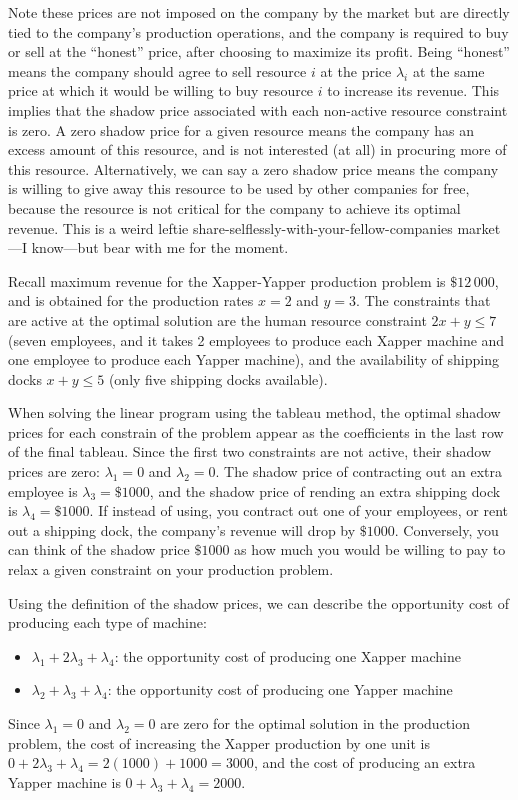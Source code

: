 \documentclass[11pt,oneside]{article}
\begin{document}
			\noindent
			Note these prices are not imposed on the company by the market but are directly tied to the company's production operations, 
			and the company is required to buy or sell at the ``honest'' price, 
			after choosing to maximize its profit.
			Being ``honest'' means the company should agree to sell resource $i$ at the price $\lambda_i$ at the same price
			at which it would be willing to buy resource $i$ to increase its revenue.
			This implies that the shadow price associated with each non-active resource constraint is zero.
			A zero shadow price for a given resource means the company has an excess amount of this resource,
			and is not interested (at all) in procuring more of this resource.
			Alternatively, 
			we can say a zero shadow price means the company is willing to give away this resource
			to be used by other companies for free, 
			because the resource is not critical for the company to achieve its optimal revenue. 
			This is a weird leftie share-selflessly-with-your-fellow-companies market---I know---but bear with me for the moment.
			
			
			Recall maximum revenue for the Xapper-Yapper production problem is $\$12\,000$, 
			and is obtained for the production rates $x=2$ and $y=3$.
			The constraints that are active at the optimal solution are the human resource constraint $2x + y \leq 7$
			(seven employees, and it takes 2 employees to produce each Xapper machine and one employee to produce each Yapper machine), 
			and the availability of shipping docks $x+ y \leq 5$ (only five shipping docks available).

			When solving the linear program using the tableau method, 
			the optimal shadow prices for each constrain of the problem appear as the coefficients in the last row of the final tableau.
			Since the first two constraints are not active, their shadow prices are zero: $\lambda_1 = 0$  and $\lambda_2 = 0$.
			The shadow price of contracting out an extra employee is $\lambda_3 = \$1000$,
			and the  shadow price of rending an extra shipping dock is $\lambda_4 = \$1000$.
			If instead of using, you contract out one of your employees, or rent out a shipping dock,
			the company's revenue will drop by $\$1000$.
			Conversely, you can think of the shadow price $\$1000$ as how much you would be willing to 
			pay to relax a given constraint on your production problem.
			

			Using the definition of the shadow prices,
			we can describe the opportunity cost of producing each type of machine:
			\begin{itemize}
				\item $\lambda_1+2\lambda_3+\lambda_4$: the opportunity cost of producing one Xapper machine
				\item $\lambda_2+\lambda_3+\lambda_4$: the opportunity cost of producing one Yapper machine
			\end{itemize}			
			Since $\lambda_1=0$ and $\lambda_2=0$ are zero for the optimal solution in the production problem,
			the cost of increasing the Xapper production by one unit is $0+2\lambda_3+\lambda_4 = 2(1000) + 1000 = 3000$,
			and the cost of producing an extra Yapper machine is $0+ \lambda_3+\lambda_4=2000$.
\end{document}
